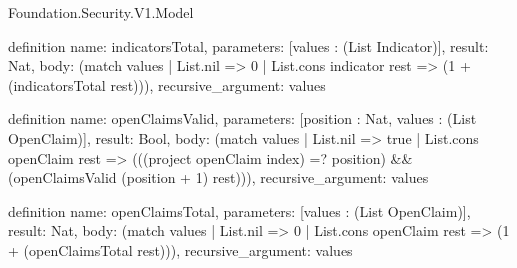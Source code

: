 \begin{lexlean}{Foundation.Security.V1.Model}
\begin{semanticmodule}
definition{
  name: indicatorsTotal,
  parameters: [values : (List Indicator)],
  result: Nat,
  body: (match values | List.nil => 0 | List.cons indicator rest => (1 + (indicatorsTotal rest))),
  recursive_argument: values
}

definition{
  name: openClaimsValid,
  parameters: [position : Nat, values : (List OpenClaim)],
  result: Bool,
  body: (match values
    | List.nil => true
    | List.cons openClaim rest => (((project openClaim index) =? position) && (openClaimsValid (position + 1) rest))),
  recursive_argument: values
}

definition{
  name: openClaimsTotal,
  parameters: [values : (List OpenClaim)],
  result: Nat,
  body: (match values | List.nil => 0 | List.cons openClaim rest => (1 + (openClaimsTotal rest))),
  recursive_argument: values
}


\end{semanticmodule}
\end{lexlean}
